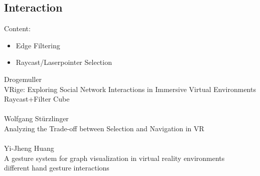 \subsection{Interaction}
Content: 
\begin{itemize}
    \item Edge Filtering
    \item Raycast/Laserpointer Selection
\end{itemize}

Drogemuller\\
VRige: Exploring Social Network Interactions in Immersive Virtual Environments\\
Raycast+Filter Cube\\
\\
Wolfgang Stürzlinger\\
Analyzing the Trade-off between Selection and Navigation in VR\\
\\
Yi-Jheng Huang\\
A gesture system for graph visualization in virtual reality environments\\
different hand gesture interactions\\
\\

